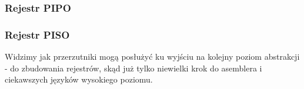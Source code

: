 \documentclass[12pt,a4paper]{article}
\begin{document}
\subsubsection{Rejestr PIPO}

\subsubsection{Rejestr PISO}

Widzimy jak przerzutniki mogą posłużyć ku wyjściu na kolejny poziom abstrakcji - do zbudowania rejestrów, skąd już tylko niewielki krok do asemblera i ciekawszych języków wysokiego poziomu.
\end{document}
